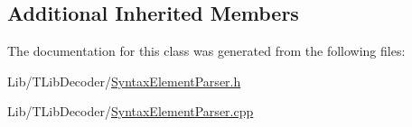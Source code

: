 \subsection*{Additional Inherited Members}


The documentation for this class was generated from the following files\+:\begin{DoxyCompactItemize}
\item 
Lib/\+T\+Lib\+Decoder/\hyperlink{_syntax_element_parser_8h}{Syntax\+Element\+Parser.\+h}\item 
Lib/\+T\+Lib\+Decoder/\hyperlink{_syntax_element_parser_8cpp}{Syntax\+Element\+Parser.\+cpp}\end{DoxyCompactItemize}
